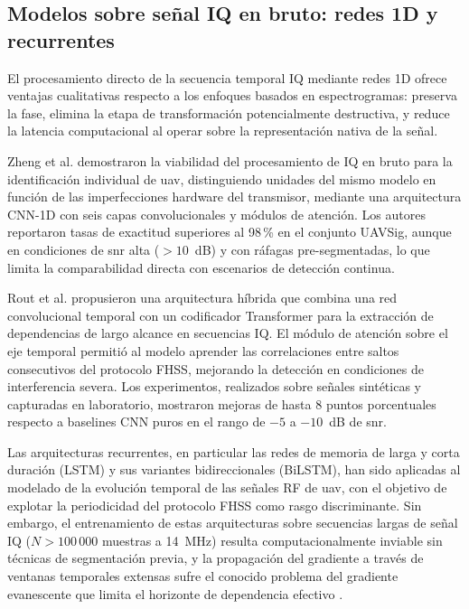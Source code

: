 \subsection{Modelos sobre señal IQ en bruto: redes 1D y recurrentes}
\label{subsec:cnn_1d}

El procesamiento directo de la secuencia temporal IQ mediante redes 1D ofrece
ventajas cualitativas respecto a los enfoques basados en espectrogramas: preserva
la fase, elimina la etapa de transformación potencialmente destructiva, y reduce
la latencia computacional al operar sobre la representación nativa de la señal.

Zheng et al. \cite{zheng_deep_2025} demostraron la viabilidad del procesamiento
de IQ en bruto para la identificación individual de \gls{uav}, distinguiendo unidades
del mismo modelo en función de las imperfecciones hardware del transmisor, mediante
una arquitectura CNN-1D con seis capas convolucionales y módulos de atención. Los
autores reportaron tasas de exactitud superiores al 98\,\% en el conjunto UAVSig,
aunque en condiciones de \gls{snr} alta ($>10$\, dB) y con ráfagas pre-segmentadas, lo
que limita la comparabilidad directa con escenarios de detección continua.

Rout et al. \cite{rout_novel_2025} propusieron una arquitectura híbrida que combina
una red convolucional temporal con un codificador Transformer para la extracción
de dependencias de largo alcance en secuencias IQ. El módulo de atención sobre el
eje temporal permitió al modelo aprender las correlaciones entre saltos consecutivos
del protocolo FHSS, mejorando la detección en condiciones de interferencia severa.
Los experimentos, realizados sobre señales sintéticas y capturadas en laboratorio,
mostraron mejoras de hasta 8 puntos porcentuales respecto a baselines CNN puros
en el rango de $-5$ a $-10$\, dB de \gls{snr}.

Las arquitecturas recurrentes, en particular las redes de memoria de larga y
corta duración (LSTM) y sus variantes bidireccionales (BiLSTM), han sido aplicadas
al modelado de la evolución temporal de las señales RF de \gls{uav}, con el objetivo
de explotar la periodicidad del protocolo FHSS como rasgo discriminante. Sin embargo,
el entrenamiento de estas arquitecturas sobre secuencias largas de señal IQ ($N >
100\,000$ muestras a 14\, MHz) resulta computacionalmente inviable sin técnicas de
segmentación previa, y la propagación del gradiente a través de ventanas temporales
extensas sufre el conocido problema del gradiente evanescente que limita el
horizonte de dependencia efectivo \cite{pascanu_difficulty_2013}.


